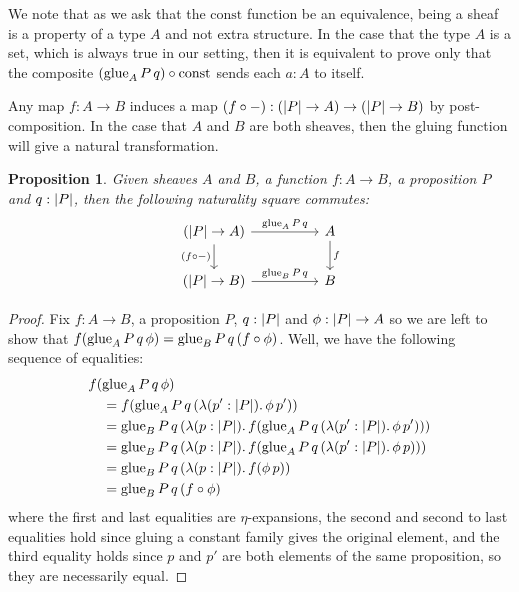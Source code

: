 \documentclass[11pt]{article}
\newtheorem{prop}[thrm]{Proposition}
\begin{document}
We note that as we ask that the \(\text{const}\) function be an equivalence,
being a sheaf is a property of a type \(A\) and not extra structure.
%
In the case that the type \(A\) is a set, which is always true in our setting,
then it is equivalent to prove only that the composite
\((\text{glue}_{A}\,P\,q) \circ \text{const}\) sends each \(a : A\) to itself.

Any map \(f : A \to B\) induces a map
\((f\circ-) : (|{P}| \to A) \to (|{P}| \to B)\) by post-composition.
%
In the case that \(A\) and \(B\) are both sheaves, then the gluing function
will give a natural transformation.

\begin{prop}
  Given sheaves \(A\) and \(B\), a function \(f : A \to B\), a proposition \(P\)
  and \(q : |{P}|\), then the following naturality square commutes:
  \[\begin{tikzcd}
      (\IHolds{P} \to A) \arrow[rr , "\IGlue{A}\,P\,q"] \arrow[d, "(f\circ-)"'] && A \arrow[d, "f"]\\
      (\IHolds{P} \to B) \arrow[rr , "\IGlue{B}\,P\,q"] && B
    \end{tikzcd}\]
\end{prop}
\begin{proof}
  Fix \(f : A \to B\), a proposition \(P\), \(q : |{P}|\) and
  \(\phi : |{P}| \to A\) so we are left to show that
  \(f(\text{glue}_{A}\,P\,q\,\phi) = \text{glue}_{B}\,P\,q\,(f \circ \phi)\).
  Well, we have the following sequence of equalities:
  \begin{align*}
    &f(\text{glue}_{A}\,P\,q\,\phi)\\
    &\quad=
      f(\text{glue}_{A}\,P\,q\,({\mathop{\lambda({p':|{P}|}).}{\phi}}\,p'))
      \\
    &\quad=
      \text{glue}_{B}\,P\,q\,({\mathop{\lambda({p:|{P}|}).}{f(\text{glue}_{A}\,P\,q\,({\mathop{\lambda({p':|{P}|}).}{\phi}}\,p'))}})
      \\
    &\quad=
      \text{glue}_{B}\,P\,q\,({\mathop{\lambda({p:|{P}|}).}{f(\text{glue}_{A}\,P\,q\,({\mathop{\lambda({p':|{P}|}).}{\phi}}\,p))}})
      \\
    &\quad=
      \text{glue}_{B}\,P\,q\,({\mathop{\lambda({p:|{P}|}).}{f(\phi\,p)}})
      \\
    &\quad=\text{glue}_{B}\,P\,q\,(f \circ \phi)
  \end{align*}
  where the first and last equalities are \(\eta\)-expansions,
  the second and second to last equalities hold since gluing a constant
  family gives the original element, and the third equality holds
  since \(p\) and \(p'\) are both elements of the same proposition, so they
  are necessarily equal.
\end{proof}
\end{document}

